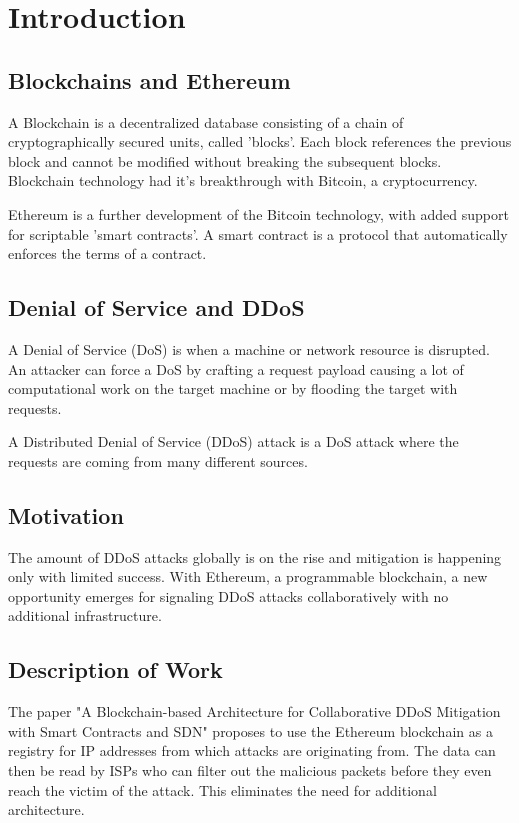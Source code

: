 \chapter{Introduction}

\section{Blockchains and Ethereum}

A Blockchain is a decentralized database consisting of a chain of cryptographically secured units, called 'blocks'. Each block references the previous block and cannot be modified without breaking the subsequent blocks.
Blockchain technology had it's breakthrough with Bitcoin, a cryptocurrency.

Ethereum \cite{Ethereum} is a further development of the Bitcoin technology, with added support for scriptable 'smart contracts'. A smart contract is a protocol that automatically enforces the terms of a contract.

\section{Denial of Service and DDoS}

A Denial of Service (DoS) is when a machine or network resource is disrupted. An attacker can force a DoS by crafting a request payload causing a lot of computational work on the target machine or by flooding the target with requests.

A Distributed Denial of Service (DDoS) attack is a DoS attack where the requests are coming from many different sources.

\section{Motivation}

The amount of DDoS attacks globally is on the rise \cite{DDoSRise} and mitigation is happening only with limited success. With Ethereum, a programmable blockchain, a new opportunity emerges for signaling DDoS attacks collaboratively with no additional infrastructure. 

\section{Description of Work}

The paper {"}A Blockchain-based Architecture for Collaborative DDoS Mitigation with Smart Contracts and SDN{"} \cite{OriginalPaper} proposes to use the Ethereum blockchain as a registry for IP addresses from which attacks are originating from. The data can then be read by ISPs who can filter out the malicious packets before they even reach the victim of the attack. This eliminates the need for additional architecture.

